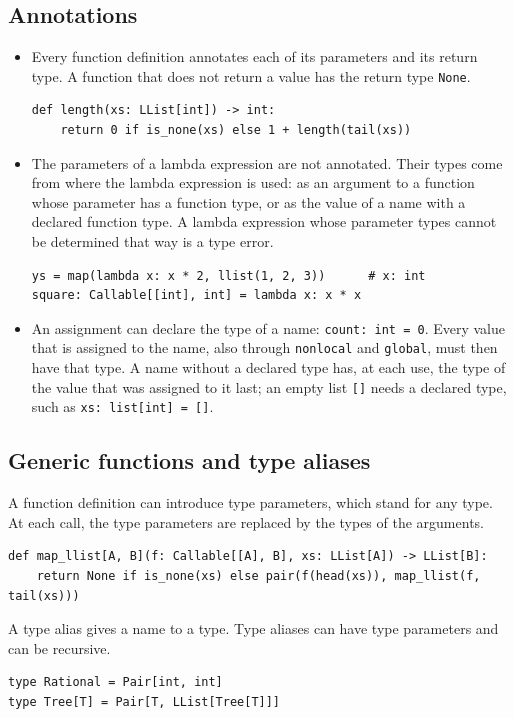 \subsection*{Annotations}

\begin{itemize}
  \item Every function definition annotates each of its parameters and its return type.
    A function that does not return a value has the return type \texttt{None}.
\begin{lstlisting}
def length(xs: LList[int]) -> int:
    return 0 if is_none(xs) else 1 + length(tail(xs))
\end{lstlisting}
  \item The parameters of a lambda expression are not annotated. Their types come from
    where the lambda expression is used: as an argument to a function whose parameter
    has a function type, or as the value of a name with a declared function type. A lambda
    expression whose parameter types cannot be determined that way is a type error.
\begin{lstlisting}
ys = map(lambda x: x * 2, llist(1, 2, 3))      # x: int
square: Callable[[int], int] = lambda x: x * x
\end{lstlisting}
  \item An assignment can declare the type of a name:
    \lstinline{count: int = 0}. Every value that is assigned to the name, also through
    \texttt{nonlocal} and \texttt{global}, must then have that type. A name without a
    declared type has, at each use, the type of the value that was assigned to it last;
    an empty list \texttt{[]} needs a declared type, such as
    \lstinline{xs: list[int] = []}.
\end{itemize}

\subsection*{Generic functions and type aliases}

A function definition can introduce type parameters, which stand for any type. At each
call, the type parameters are replaced by the types of the arguments.
\begin{lstlisting}
def map_llist[A, B](f: Callable[[A], B], xs: LList[A]) -> LList[B]:
    return None if is_none(xs) else pair(f(head(xs)), map_llist(f, tail(xs)))
\end{lstlisting}
A type alias gives a name to a type. Type aliases can have type parameters and can be
recursive.
\begin{lstlisting}
type Rational = Pair[int, int]
type Tree[T] = Pair[T, LList[Tree[T]]]
\end{lstlisting}

